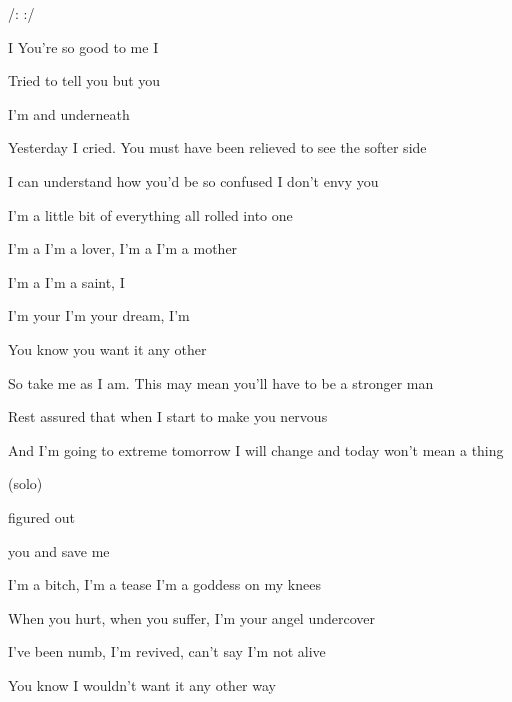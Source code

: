 
/:    :/

\zs
I  
You're so good to me I
 

Tried to tell you but you 

I'm and  underneath 
 \ks

\zs
Yesterday I cried. You must have been relieved to see the softer side

I can understand how you'd be so confused I don't envy you

I'm a little bit of everything all rolled into one
\ks

\zr
I'm a  I'm a lover, I'm a  I'm a mother

I'm a  I'm a saint, I 

I'm your  I'm your dream, I'm 

You know you  want it any other 
\kr

\zs
So take me as I am. This may mean you'll have to be a stronger man

Rest assured that when I start to make you nervous

And I'm going to extreme tomorrow I will change and today won't mean a thing
\ks

\zr

\kr

\zr (solo) \kr

 figured out  

 you  and  save me

\zr
\kr

\zr
I'm a bitch, I'm a tease  I'm a goddess on my knees

When you hurt, when you suffer, I'm your angel undercover

I've been numb, I'm revived, can't say I'm not alive

You know I wouldn't want it any other way
\kr

        
      

\kp
